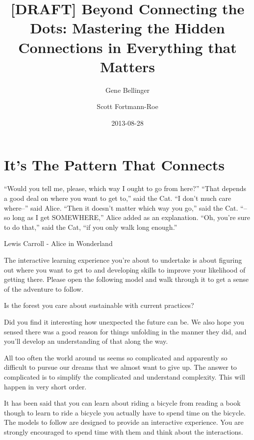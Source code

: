 \documentclass[]{memoir}
\title{{[}DRAFT{]} Beyond Connecting the Dots: Mastering the Hidden Connections
       in Everything that Matters}
\author{Gene Bellinger \and Scott Fortmann-Roe}
\date{2013-08-28}
\begin{document}
\maketitle

{
\hypersetup{linkcolor=black}
\setcounter{tocdepth}{1}
\tableofcontents
}
\chapter{It's The Pattern That Connects}

``Would you tell me, please, which way I ought to go from here?'' ``That
depends a good deal on where you want to get to,'' said the Cat. ``I
don't much care where--'' said Alice. ``Then it doesn't matter which way
you go,'' said the Cat. ``--so long as I get SOMEWHERE,'' Alice added as
an explanation. ``Oh, you're sure to do that,'' said the Cat, ``if you
only walk long enough.''

Lewis Carroll - Alice in Wonderland

The interactive learning experience you're about to undertake is about
figuring out where you want to get to and developing skills to improve
your likelihood of getting there. Please open the following model and
walk through it to get a sense of the adventure to follow.

\FloatBarrier 

\begin{model}[frametitle={Model: Where have all the trees gone?}] 

 Is the forest you care about sustainable with current practices?




 \end{model}

Did you find it interesting how unexpected the future can be. We also
hope you sensed there was a good reason for things unfolding in the
manner they did, and you'll develop an understanding of that along the
way.

All too often the world around us seems so complicated and apparently so
difficult to pursue our dreams that we almost want to give up. The
answer to complicated is to simplify the complicated and understand
complexity. This will happen in very short order.

It has been said that you can learn about riding a bicycle from reading
a book though to learn to ride a bicycle you actually have to spend time
on the bicycle. The models to follow are designed to provide an
interactive experience. You are strongly encouraged to spend time with
them and think about the interactions.
\end{document}
